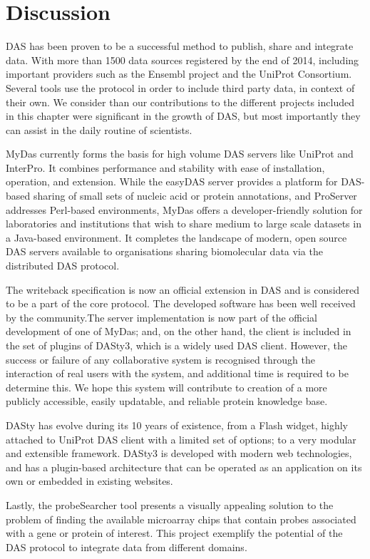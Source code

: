 \section{Discussion}
DAS has been proven to be a successful method to publish, share and integrate data. With more than 1500 data sources registered by the end of 2014, including important providers such as the Ensembl project and the UniProt Consortium. Several tools use the protocol in order to include third party data, in context of their own. We consider than our contributions to the different projects included in this chapter were significant in the growth of DAS, but most importantly they can assist in the daily routine of scientists.

MyDas currently forms the basis for high volume DAS servers like UniProt and InterPro. It combines performance and stability with ease of installation, operation, and extension. While the easyDAS server provides a platform for DAS-based sharing of small sets of nucleic acid or protein annotations, and ProServer addresses Perl-based environments, MyDas offers a developer-friendly solution for laboratories and institutions that wish to share medium to large scale datasets in a Java-based environment. It completes the landscape of modern, open source DAS servers available to organisations sharing biomolecular data via the distributed DAS protocol. 

The writeback specification is now an official extension in DAS and is considered to be a part of the core protocol. The developed software has been well received by the community.The server implementation is now part of the official development of one of MyDas; and, on the other hand, the client is included in the set of plugins of DASty3, which is a widely used DAS client. However, the success or failure of any collaborative system is recognised through the interaction of real users with the system, and additional time is required to be determine this. We hope this system will contribute to creation of a more publicly accessible, easily updatable, and reliable protein knowledge base.

DASty has evolve during its 10 years of existence, from a Flash widget, highly attached to UniProt DAS client with a limited set of options; to a very modular and extensible framework. DASty3 is developed with modern web technologies, and has a plugin-based architecture that can be operated as an application on its own or embedded in existing websites.

Lastly, the probeSearcher tool presents a visually appealing solution to the problem of finding the available microarray chips that contain probes associated with a gene or protein of interest. This project exemplify the potential of the DAS protocol to integrate data from different domains.

